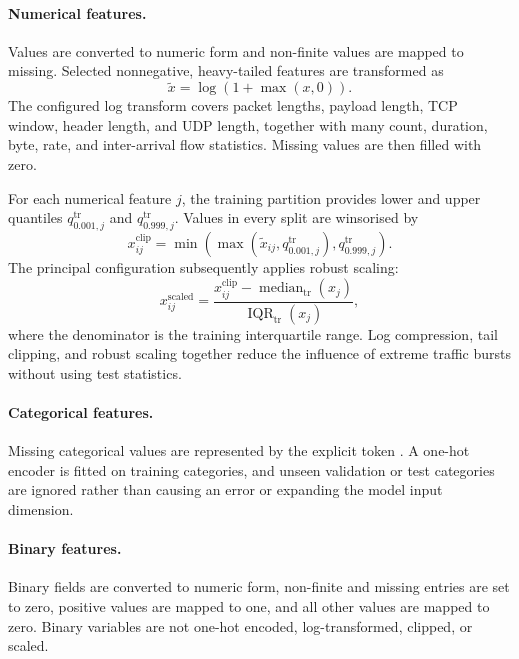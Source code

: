 \documentclass[11pt,fleqn]{report}
\begin{document}
\paragraph{Numerical features.}
Values are converted to numeric form and non-finite values are mapped to missing. Selected nonnegative, heavy-tailed features are transformed as
\begin{equation}
    \widetilde{x}=\log(1+\max(x,0)).
    \label{eq:log1p_preprocessing}
\end{equation}
The configured log transform covers packet lengths, payload length, TCP window, header length, and UDP length, together with many count, duration, byte, rate, and inter-arrival flow statistics. Missing values are then filled with zero.

For each numerical feature $j$, the training partition provides lower and upper quantiles $q_{0.001,j}^{\mathrm{tr}}$ and $q_{0.999,j}^{\mathrm{tr}}$. Values in every split are winsorised by
\begin{equation}
    x_{ij}^{\mathrm{clip}}
    = \min\!\left(
        \max\!\left(\widetilde{x}_{ij},q_{0.001,j}^{\mathrm{tr}}\right),
        q_{0.999,j}^{\mathrm{tr}}
      \right).
    \label{eq:quantile_clipping}
\end{equation}
The principal configuration subsequently applies robust scaling:
\begin{equation}
    x_{ij}^{\mathrm{scaled}}
    = \frac{x_{ij}^{\mathrm{clip}}-
             \operatorname{median}_{\mathrm{tr}}(x_j)}
            {\operatorname{IQR}_{\mathrm{tr}}(x_j)},
    \label{eq:robust_scaling}
\end{equation}
where the denominator is the training interquartile range. Log compression, tail clipping, and robust scaling together reduce the influence of extreme traffic bursts without using test statistics.

\paragraph{Categorical features.}
Missing categorical values are represented by the explicit token . A one-hot encoder is fitted on training categories, and unseen validation or test categories are ignored rather than causing an error or expanding the model input dimension.

\paragraph{Binary features.}
Binary fields are converted to numeric form, non-finite and missing entries are set to zero, positive values are mapped to one, and all other values are mapped to zero. Binary variables are not one-hot encoded, log-transformed, clipped, or scaled.
\end{document}
